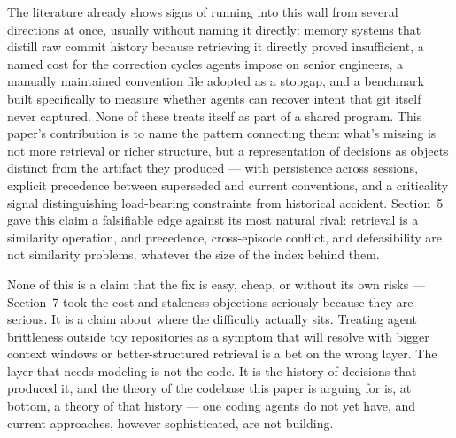 \documentclass[11pt]{article}
\begin{document}
The literature already shows signs of running into this wall from several directions at once, usually without naming it directly: memory systems that distill raw commit history because retrieving it directly proved insufficient, a named cost for the correction cycles agents impose on senior engineers, a manually maintained convention file adopted as a stopgap, and a benchmark built specifically to measure whether agents can recover intent that git itself never captured. None of these treats itself as part of a shared program. This paper's contribution is to name the pattern connecting them: what's missing is not more retrieval or richer structure, but a representation of decisions as objects distinct from the artifact they produced --- with persistence across sessions, explicit precedence between superseded and current conventions, and a criticality signal distinguishing load-bearing constraints from historical accident. Section~5 gave this claim a falsifiable edge against its most natural rival: retrieval is a similarity operation, and precedence, cross-episode conflict, and defeasibility are not similarity problems, whatever the size of the index behind them.

None of this is a claim that the fix is easy, cheap, or without its own risks --- Section~7 took the cost and staleness objections seriously because they are serious. It is a claim about where the difficulty actually sits. Treating agent brittleness outside toy repositories as a symptom that will resolve with bigger context windows or better-structured retrieval is a bet on the wrong layer. The layer that needs modeling is not the code. It is the history of decisions that produced it, and the theory of the codebase this paper is arguing for is, at bottom, a theory of that history --- one coding agents do not yet have, and current approaches, however sophisticated, are not building.



\end{document}
